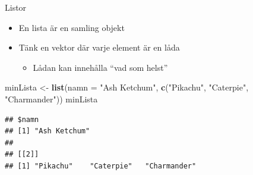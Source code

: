 \documentclass[
  11pt,
  ignorenonframetext,
]{beamer}
\newenvironment{Shaded}{\begin{snugshade}}{\end{snugshade}}
\newcommand{\AttributeTok}[1]{\textcolor[rgb]{0.13,0.29,0.53}{#1}}
\newcommand{\FunctionTok}[1]{\textcolor[rgb]{0.13,0.29,0.53}{\textbf{#1}}}
\newcommand{\NormalTok}[1]{#1}
\newcommand{\OtherTok}[1]{\textcolor[rgb]{0.56,0.35,0.01}{#1}}
\newcommand{\StringTok}[1]{\textcolor[rgb]{0.31,0.60,0.02}{#1}}
\providecommand{\tightlist}{%
  \setlength{\itemsep}{0pt}\setlength{\parskip}{0pt}}
\begin{document}
\begin{frame}[fragile]{Listor}
\label{listor-1}
\begin{itemize}
\tightlist
\item
  En lista är en samling objekt
\item
  Tänk en vektor där varje element är en låda

  \begin{itemize}
  \tightlist
  \item
    Lådan kan innehålla ``vad som helst''
  \end{itemize}
\end{itemize}

\begin{Shaded}
\begin{Highlighting}[]
\NormalTok{minLista }\OtherTok{\textless{}{-}} \FunctionTok{list}\NormalTok{(}\AttributeTok{namn =} \StringTok{"Ash Ketchum"}\NormalTok{,}
             \FunctionTok{c}\NormalTok{(}\StringTok{"Pikachu"}\NormalTok{, }\StringTok{"Caterpie"}\NormalTok{, }\StringTok{"Charmander"}\NormalTok{))}
\NormalTok{minLista}
\end{Highlighting}
\end{Shaded}

\begin{verbatim}
## $namn
## [1] "Ash Ketchum"
## 
## [[2]]
## [1] "Pikachu"    "Caterpie"   "Charmander"
\end{verbatim}
\end{frame}
\end{document}

